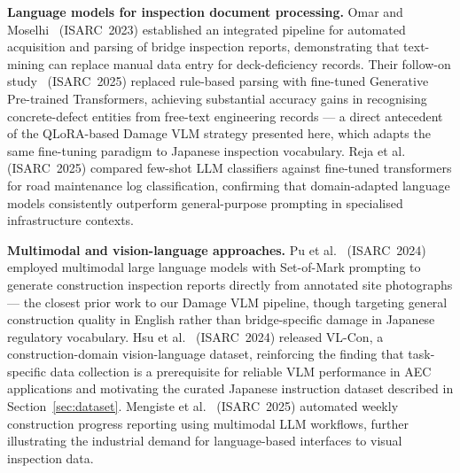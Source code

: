 \documentclass[twocolumn]{article}
\begin{document}
\textbf{Language models for inspection document processing.}
Omar and Moselhi~\cite{omar2023bridge} (ISARC~2023) established an
integrated pipeline for automated acquisition and parsing of bridge
inspection reports, demonstrating that text-mining can replace manual
data entry for deck-deficiency records.
Their follow-on study~\cite{omar2025bridge} (ISARC~2025) replaced
rule-based parsing with fine-tuned Generative Pre-trained Transformers,
achieving substantial accuracy gains in recognising concrete-defect
entities from free-text engineering records --- a direct antecedent of
the QLoRA-based Damage VLM strategy presented here, which adapts the
same fine-tuning paradigm to Japanese inspection vocabulary.
Reja et al.~\cite{reja2025llm} (ISARC~2025) compared few-shot LLM
classifiers against fine-tuned transformers for road maintenance log
classification, confirming that domain-adapted language models
consistently outperform general-purpose prompting in specialised
infrastructure contexts.

\textbf{Multimodal and vision-language approaches.}
Pu et al.~\cite{pu2024mllm} (ISARC~2024) employed multimodal large
language models with Set-of-Mark prompting to generate construction
inspection reports directly from annotated site photographs --- the
closest prior work to our Damage VLM pipeline, though targeting
general construction quality in English rather than bridge-specific
damage in Japanese regulatory vocabulary.
Hsu et al.~\cite{hsu2024vlcon} (ISARC~2024) released VL-Con, a
construction-domain vision-language dataset, reinforcing the finding
that task-specific data collection is a prerequisite for reliable VLM
performance in AEC applications and motivating the curated Japanese
instruction dataset described in Section~\ref{sec:dataset}.
Mengiste et al.~\cite{mengiste2025progress} (ISARC~2025) automated
weekly construction progress reporting using multimodal LLM workflows,
further illustrating the industrial demand for language-based interfaces
to visual inspection data.
\end{document}
